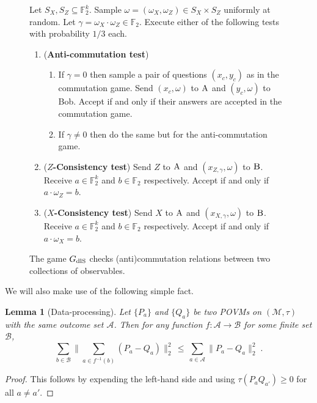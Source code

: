 \documentclass[11pt]{article}
\newtheorem{lemma}[theorem]{Lemma}
\theoremstyle{definition}
\newcommand{\field}{\mathbb{F}_2}
\newcommand{\dlS}{\ensuremath{\rm dlS}}
\newcommand{\mA}{\ensuremath{\mathcal{A}}}
\newcommand{\mB}{\ensuremath{\mathcal{B}}}
\newcommand{\mM}{\ensuremath{\mathcal{M}}}
\newcommand{\labelstyle}[1]{\ensuremath{\textsc{#1}}\xspace}
\newcommand{\alice}{\labelstyle{A}}
\newcommand{\bob}{\labelstyle{B}}
\newenvironment{gamespec}{
  \begin{mdframed}[style=figstyle]}{
  \end{mdframed}}
\begin{document}
\begin{figure}[!htbp]
  \centering
  \begin{gamespec}
Let $S_X,S_Z\subseteq \field^k$.  Sample $\omega = (\omega_X,\omega_Z)\in S_X \times S_Z $ uniformly at random. Let $\gamma = \omega_X \cdot \omega_Z \in \field$. Execute either of the following tests with probability $1/3$ each. 
    \begin{enumerate}
      \setlength\itemsep{1pt}
    \item (\textbf{Anti-commutation test}) 
		\begin{enumerate}
		\item If $\gamma=0$ then sample a pair of questions $(x_c,y_c)$ as in the commutation game. Send $(x_c,\omega)$ to $\alice$ and $(y_c,\omega)$ to Bob. Accept if and only if their answers are accepted in the commutation game. 
		\item If $\gamma\neq 0$ then do the same but for the anti-commutation game. 
		\end{enumerate} 
		 \item (\textbf{$Z$-Consistency test}) Send $Z$ to $\alice$ and $(x_{Z,\gamma},\omega)$ to $\bob$. Receive $a\in \field^k$ and $b\in \field$ respectively. Accept if and only if $a\cdot \omega_Z=b$. 
		 \item (\textbf{$X$-Consistency test}) Send $X$ to $\alice$ and $(x_{X,\gamma},\omega)$ to $\bob$. Receive $a\in \field^k$ and $b\in \field$ respectively. Accept if and only if $a\cdot \omega_X=b$. 
    \end{enumerate}
  \end{gamespec}
  \caption{The game $G_{\dlS}$ checks (anti)commutation relations between two collections of observables.}
  \label{fig:dlS}
\end{figure}

We will also make use of the following simple fact. 


\begin{lemma}[Data-processing]\label{lem:dp}
Let $\{P_a\}$ and $\{Q_a\}$ be two POVMs on $(\mM,\tau)$ with the same outcome set $\mA$. Then for any function $f:\mA\to \mB$ for some finite set $\mB$, 
\begin{equation}\label{eq:dp}
\sum_{b\in \mB} \Big\| \sum_{a\in f^{-1}(b)} (P_a-Q_a) \Big\|_2^2 \,\leq\, \sum_{a\in \mA} \big\| P_a-Q_a\big\|_2^2\;.
\end{equation}
\end{lemma}

\begin{proof}
This follows by expending the left-hand side and using $\tau(P_aQ_{a'})\geq 0$ for all $a\neq a'$. 
\end{proof}
\end{document}
